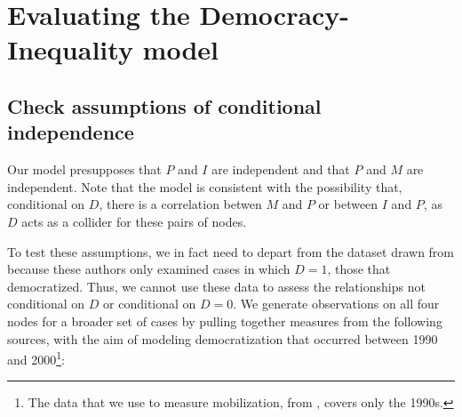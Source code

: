 \documentclass[
  12pt,
]{book}
\begin{document}
\hypertarget{evaluating-the-democracy-inequality-model}{%
\section{Evaluating the Democracy-Inequality model}\label{evaluating-the-democracy-inequality-model}}

\hypertarget{check-assumptions-of-conditional-independence}{%
\subsection{Check assumptions of conditional independence}\label{check-assumptions-of-conditional-independence}}

Our model presupposes that \(P\) and \(I\) are independent and that \(P\) and \(M\) are independent. Note that the model is consistent with the possibility that, conditional on \(D\), there is a correlation betwen \(M\) and \(P\) or between \(I\) and \(P\), as \(D\) acts as a collider for these pairs of nodes.

To test these assumptions, we in fact need to depart from the dataset drawn from \citet{haggard2012distributive} because these authors only examined cases in which \(D=1\), those that democratized. Thus, we cannot use these data to assess the relationships not conditional on \(D\) or conditional on \(D=0\). We generate observations on all four nodes for a broader set of cases by pulling together measures from the following sources, with the aim of modeling democratization that occurred between 1990 and 2000\footnote{The data that we use to measure mobilization, from \citet{clark2016mobilization}, covers only the 1990s.}:
\end{document}
